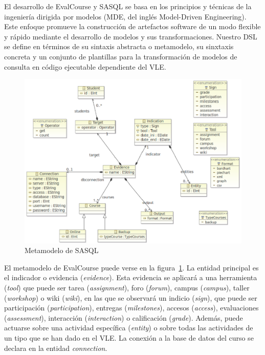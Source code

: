 El desarrollo de EvalCourse y SASQL se basa en los principios y técnicas de la ingeniería dirigida por modelos (MDE, del inglés Model-Driven Engineering). Este enfoque promueve la construcción de artefactos software de un modo flexible y rápido mediante el desarrollo de modelos y sus transformaciones. Nuestro DSL se define en términos de su sintaxis abstracta o metamodelo, su sinxtaxis concreta y un conjunto de plantillas para la transformación de modelos de consulta en código ejecutable dependiente del VLE.

\begin{figure}
  \begin{center}
    \includegraphics[scale=0.4]{EvcMetamodel.png}
  \end{center}
  \caption{Metamodelo de SASQL}
  \label{fig:EvcMetamodel}
\end{figure}

El metamodelo de EvalCourse puede verse en la figura~\ref{fig:EvcMetamodel}. La entidad principal es el indicador o evidencia (\emph{evidence}). Esta evidencia se aplicará a una herramienta (\emph{tool}) que puede ser tarea (\emph{assignment}), foro (\emph{forum}), campus (\emph{campus}), taller (\emph{workshop}) o wiki (\emph{wiki}), en las que se observará un indicio (\emph{sign}), que puede ser participación (\emph{participation}), entregas (\emph{milestones}), accesos (\emph{access}), evaluaciones (\emph{assessment}), interacción (\emph{interaction}) o calificación (\emph{grade}). Además, puede actuarse sobre una actividad específica (\emph{entity}) o sobre todas las actividades de un tipo que se han dado en el VLE. La conexión a la base de datos del curso se declara en la entidad \emph{connection}. 

